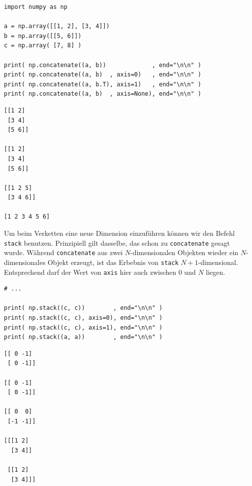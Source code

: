 \begin{codebox}
\begin{verbatim}
import numpy as np

a = np.array([[1, 2], [3, 4]])
b = np.array([[5, 6]])
c = np.array( [7, 8] )

print( np.concatenate((a, b))             , end="\n\n" )
print( np.concatenate((a, b)  , axis=0)   , end="\n\n" )
print( np.concatenate((a, b.T), axis=1)   , end="\n\n" )
print( np.concatenate((a, b)  , axis=None), end="\n\n" )
\end{verbatim}
\end{codebox}

\begin{cmdbox}
\begin{verbatim}
[[1 2]
 [3 4]
 [5 6]]
 
[[1 2]
 [3 4]
 [5 6]]

[[1 2 5]
 [3 4 6]]

[1 2 3 4 5 6]
\end{verbatim}
\end{cmdbox}

Um beim Verketten eine neue Dimension einzuführen können wir den Befehl \texttt{stack} benutzen. Prinzipiell gilt dasselbe, das schon zu \texttt{concatenate} gesagt wurde. Während \texttt{concatenate} aus zwei $N$-dimensionalen Objekten wieder ein $N$-dimensionales Objekt erzeugt, ist das Erbebnis von \texttt{stack} $N+1$-dimensional. Entsprechend darf der Wert von \texttt{axis} hier auch zwischen $0$ und $N$ liegen.

\begin{codebox}
\begin{verbatim}
# ...

print( np.stack((c, c))        , end="\n\n" )
print( np.stack((c, c), axis=0), end="\n\n" )
print( np.stack((c, c), axis=1), end="\n\n" )
print( np.stack((a, a))        , end="\n\n" )
\end{verbatim}
\end{codebox}

\begin{cmdbox}
\begin{verbatim}
[[ 0 -1]
 [ 0 -1]]

[[ 0 -1]
 [ 0 -1]]

[[ 0  0]
 [-1 -1]]

[[[1 2]
  [3 4]]

 [[1 2]
  [3 4]]]
\end{verbatim}
\end{cmdbox}


